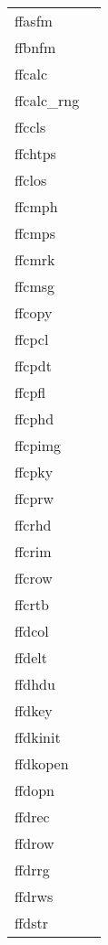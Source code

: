 \documentclass[11pt]{book}
\begin{document}
\newpage
\begin{tabular}{lr}
ffasfm    & \pageref{ffasfm} \\
ffbnfm   & \pageref{ffbnfm} \\
ffcalc     & \pageref{ffcalc} \\
ffcalc\_rng     & \pageref{ffcalcrng} \\
ffccls     & \pageref{ffccls} \\
ffchtps    & \pageref{ffchtps} \\
ffclos     & \pageref{ffclos} \\
ffcmph & \pageref{ffcmph} \\
ffcmps    & \pageref{ffcmps} \\
ffcmrk  & \pageref{ffpmrk} \\
ffcmsg  & \pageref{ffcmsg} \\
ffcopy     & \pageref{ffcopy} \\
ffcpcl     & \pageref{ffcpcl} \\
ffcpdt      & \pageref{ffcpdt} \\
ffcpfl      & \pageref{ffcpfl} \\
ffcphd   & \pageref{ffcphd} \\
ffcpimg  & \pageref{ffcpimg} \\
ffcpky       & \pageref{ffcpky} \\
ffcprw      &   \pageref{ffcprw} \\
ffcrhd     & \pageref{ffcrhd} \\
ffcrim     & \pageref{ffcrim} \\
ffcrow    & \pageref{ffcrow} \\
ffcrtb     & \pageref{ffcrtb} \\
ffdcol   & \pageref{ffdcol} \\
ffdelt    & \pageref{ffdelt} \\
ffdhdu     & \pageref{ffdhdu} \\
ffdkey     & \pageref{ffdkey} \\
ffdkinit  & \pageref{ffinit} \\
ffdkopen      & \pageref{ffopen} \\
ffdopn      & \pageref{ffopen} \\
ffdrec  & \pageref{ffdrec} \\
ffdrow  & \pageref{ffdrow} \\
ffdrrg  & \pageref{ffdrrg} \\
ffdrws & \pageref{ffdrws} \\
ffdstr     & \pageref{ffdkey} \\

\end{tabular}
\end{document}
